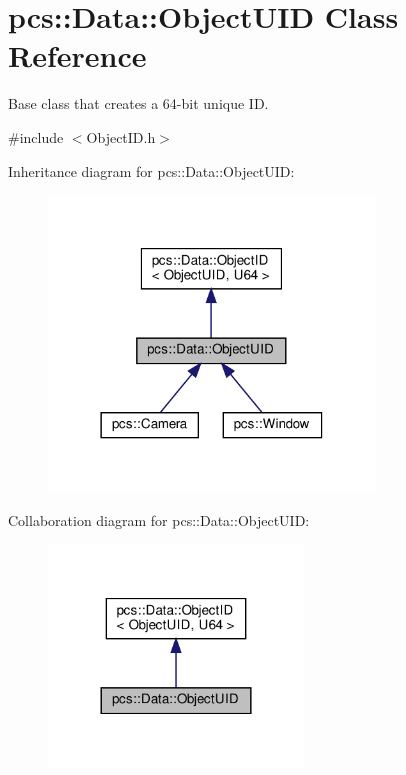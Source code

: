 \hypertarget{classpcs_1_1Data_1_1ObjectUID}{}\section{pcs\+:\+:Data\+:\+:Object\+U\+ID Class Reference}
\label{classpcs_1_1Data_1_1ObjectUID}


Base class that creates a 64-\/bit unique ID.  




{\ttfamily \#include $<$Object\+I\+D.\+h$>$}



Inheritance diagram for pcs\+:\+:Data\+:\+:Object\+U\+ID\+:\nopagebreak
\begin{figure}[H]
\begin{center}
\leavevmode
\includegraphics[width=246pt]{classpcs_1_1Data_1_1ObjectUID__inherit__graph}
\end{center}
\end{figure}


Collaboration diagram for pcs\+:\+:Data\+:\+:Object\+U\+ID\+:\nopagebreak
\begin{figure}[H]
\begin{center}
\leavevmode
\includegraphics[width=192pt]{classpcs_1_1Data_1_1ObjectUID__coll__graph}
\end{center}
\end{figure}
